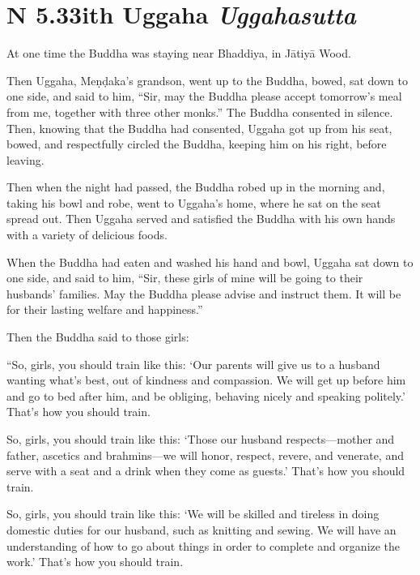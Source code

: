 \documentclass[12pt,openany]{book}%
\newcommand*{\suttatitleacronym}[1]{\smaller[2]{#1}\vspace*{.3em}}
\newcommand*{\suttatitletranslation}[1]{\linebreak{#1}}
\newcommand*{\suttatitleroot}[1]{\linebreak\smaller[2]\itshape{#1}}
\newcommand*{\tocacronym}[1]{\hspace*{-3.3em}{#1}\quad}
\newcommand*{\toctranslation}[1]{#1}
\newcommand*{\tocroot}[1]{(\textit{#1})}
\begin{document}
%
\section*{{\suttatitleacronym AN 5.33}{\suttatitletranslation With Uggaha }{\suttatitleroot Uggahasutta}}
\addcontentsline{toc}{section}{\tocacronym{AN 5.33} \toctranslation{With Uggaha } \tocroot{Uggahasutta}}

At one time the Buddha was staying near Bhaddiya, in \textsanskrit{Jātiyā} Wood. 

Then Uggaha, \textsanskrit{Meṇḍaka}’s grandson, went up to the Buddha, bowed, sat down to one side, and said to him, “Sir, may the Buddha please accept tomorrow’s meal from me, together with three other monks.” The Buddha consented in silence. Then, knowing that the Buddha had consented, Uggaha got up from his seat, bowed, and respectfully circled the Buddha, keeping him on his right, before leaving. 

Then when the night had passed, the Buddha robed up in the morning and, taking his bowl and robe, went to Uggaha’s home, where he sat on the seat spread out. Then Uggaha served and satisfied the Buddha with his own hands with a variety of delicious foods. 

When the Buddha had eaten and washed his hand and bowl, Uggaha sat down to one side, and said to him, “Sir, these girls of mine will be going to their husbands’ families. May the Buddha please advise and instruct them. It will be for their lasting welfare and happiness.” 

Then the Buddha said to those girls: 

“So, girls, you should train like this: ‘Our parents will give us to a husband wanting what’s best, out of kindness and compassion. We will get up before him and go to bed after him, and be obliging, behaving nicely and speaking politely.’ That’s how you should train. 

So, girls, you should train like this: ‘Those our husband respects—mother and father, ascetics and brahmins—we will honor, respect, revere, and venerate, and serve with a seat and a drink when they come as guests.’ That’s how you should train. 

So, girls, you should train like this: ‘We will be skilled and tireless in doing domestic duties for our husband, such as knitting and sewing. We will have an understanding of how to go about things in order to complete and organize the work.’ That’s how you should train. 
\end{document}
